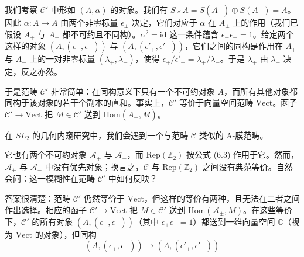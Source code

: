 我们考察 $\mathcal{C}'$ 中形如 $(A,\alpha)$ 的对象。我们有 $S\star A = S(A_+)\oplus S(A_-) = A$。因此 $\alpha : A\to A$ 由两个非零标量 $\epsilon_\pm$ 决定，它们对应于 $\alpha$ 在 $A_\pm$ 上的作用（我们已假设 $A_+$ 与 $A_-$ 都不可约且不同构）。$\alpha^2 = \mathrm{id}$ 这一条件蕴含 $\epsilon_+\epsilon_- = 1$。给定两个这样的对象 $(A,(\epsilon_+,\epsilon_-))$ 与 $(A,(\epsilon'_+,\epsilon'_-))$，它们之间的同构是作用在 $A_+$ 与 $A_-$ 上的一对非零标量 $(\lambda_+,\lambda_-)$，使得 $\epsilon_+/\epsilon'_+ = \lambda_+/\lambda_-$。于是 $\lambda_+$ 由 $\lambda_-$ 决定，反之亦然。

于是范畴 $\mathcal{C}'$ 非常简单：在同构意义下只有一个不可约对象 $A$，而所有其他对象都同构于该对象的若干个副本的直和。事实上，$\mathcal{C}'$ 等价于向量空间范畴 $\mathrm{Vect}$。函子 $\mathcal{C}'\to\mathrm{Vect}$ 把 $M\in\mathcal{C}'$ 送到 $\mathrm{Hom}(A_+,M)$。

在 $SL_2$ 的几何内窥研究中，我们会遇到一个与范畴 $\mathcal{C}$ 类似的 A-膜范畴。


它也有两个不可约对象 $\mathcal{A}_+$ 与 $\mathcal{A}_-$，而 $\mathrm{Rep}(\mathbb{Z}_2)$ 按公式 (6.3) 作用于它。然而，$\mathcal{A}_+$ 与 $\mathcal{A}_-$ 中没有优先对象；换言之，$\mathcal{C}$ 与 $\mathrm{Rep}(\mathbb{Z}_2)$ 之间没有典范等价。自然会问：这一模糊性在范畴 $\mathcal{C}'$ 中如何反映？

答案很清楚：范畴 $\mathcal{C}'$ 仍然等价于 $\mathrm{Vect}$，但这样的等价有两种，且无法在二者之间作出选择。相应的函子 $\mathcal{C}'\to\mathrm{Vect}$ 把 $M\in\mathcal{C}'$ 送到 $\mathrm{Hom}(\mathcal{A}_\pm,M)$。在这些等价下，$\mathcal{C}'$ 的所有对象 $(A,(\epsilon_+,\epsilon_-))$（其中 $\epsilon_+\epsilon_- = 1$）都送到一维向量空间 $\mathbb{C}$（视为 $\mathrm{Vect}$ 的对象），但同构
\[
(A,(\epsilon_+,\epsilon_-))\to(A,(\epsilon'_+,\epsilon'_-))
\]


